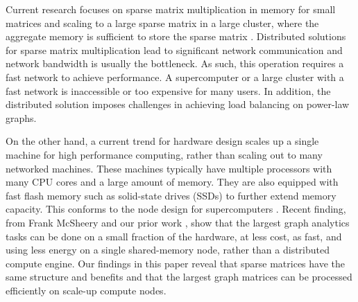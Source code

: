 %




Current research focuses on sparse matrix multiplication in memory
for small matrices and scaling to a large sparse matrix in a large cluster,
where the aggregate memory is sufficient to store the sparse matrix
\cite{Williams07, Yoo11, Boman2013}.
Distributed solutions for sparse matrix multiplication lead to significant
network communication and network bandwidth is usually the bottleneck.
As such, this operation requires a fast network to achieve performance.
A supercomputer or a large cluster with a fast network is inaccessible or
too expensive for many users. In addition, the distributed solution imposes
challenges in achieving load balancing on power-law graphs.

On the other hand, a current trend for hardware design scales up
a single machine for high performance computing, rather than scaling out to 
many networked machines.
These machines typically have multiple processors with many CPU cores and
a large amount of memory. They are also equipped with fast flash
memory such as solid-state drives (SSDs) to further extend memory capacity.
This conforms to the node design for supercomputers \cite{Ang14}.
Recent finding, from Frank McSheery \cite{McSherry15,McSherryBlog} and our
prior work \cite{FlashGraph},
show that the largest graph analytics tasks can be done on a small fraction of
the hardware, at less cost, as fast, and using less energy on a single shared-memory 
node, rather than a distributed compute engine.  Our findings in this paper reveal
that sparse matrices have the same structure and benefits and that the largest graph
matrices can be processed efficiently on scale-up compute nodes.

